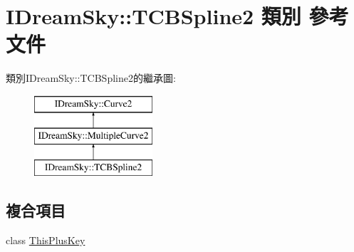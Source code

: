 \hypertarget{class_i_dream_sky_1_1_t_c_b_spline2}{}\section{I\+Dream\+Sky\+:\+:T\+C\+B\+Spline2 類別 參考文件}
\label{class_i_dream_sky_1_1_t_c_b_spline2}
類別\+I\+Dream\+Sky\+:\+:T\+C\+B\+Spline2的繼承圖\+:\begin{figure}[H]
\begin{center}
\leavevmode
\includegraphics[height=3.000000cm]{class_i_dream_sky_1_1_t_c_b_spline2}
\end{center}
\end{figure}
\subsection*{複合項目}
\begin{DoxyCompactItemize}
\item 
class \hyperlink{class_i_dream_sky_1_1_t_c_b_spline2_1_1_this_plus_key}{This\+Plus\+Key}
\end{DoxyCompactItemize}

